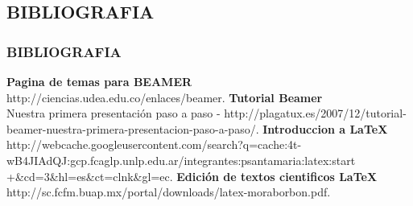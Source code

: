 \documentclass{beamer}						%
\begin{document}
	\begin{frame}
		\section{BIBLIOGRAFIA}
		\frametitle{BIBLIOGRAFIA}
		
		\begin{thebibliography}{99}
			\normalsize
			 \textbf{Pagina de temas para BEAMER}\\ http://ciencias.udea.edu.co/enlaces/beamer.
			 \textbf{Tutorial Beamer}\\ Nuestra primera presentación paso a paso - http://plagatux.es/2007/12/tutorial-beamer-nuestra-primera-presentacion-paso-a-paso/.
			 \textbf{Introduccion a LaTeX}\\ http://webcache.googleusercontent.com/search?q=cache:4t-wB4JIAdQJ:gcp.fcaglp.unlp.edu.ar/integrantes:psantamaria:latex:start\\+\&cd=3\&hl=es\&ct=clnk\&gl=ec.
			 \textbf{Edición de textos cientificos \LaTeX}\\http://sc.fcfm.buap.mx/portal/downloads/latex-moraborbon.pdf.
		\end{thebibliography}
		
	\end{frame}
	
\end{document}
